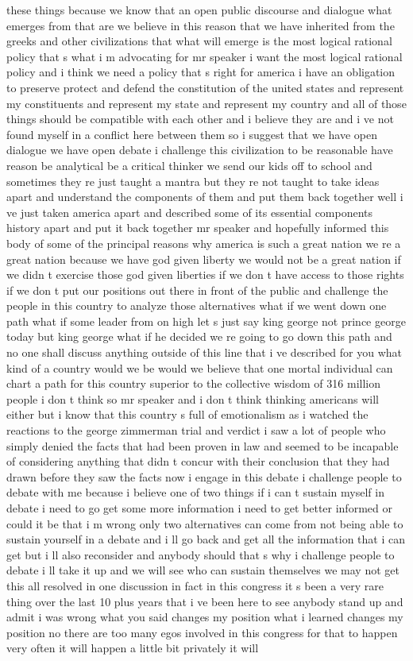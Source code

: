 \documentclass{article}
\begin{document}
these things because we know that an open public discourse and dialogue what emerges from that are we believe in this reason that we have inherited from the greeks and other civilizations that what will emerge is the most logical rational policy that s what i m advocating for mr speaker i want the most logical rational policy and i think we need a policy that s right for america i have an obligation to preserve protect and defend the constitution of the united states and represent my constituents and represent my state and represent my country and all of those things should be compatible with each other and i believe they are and i ve not found myself in a conflict here between them so i suggest that we have open dialogue we have open debate i challenge this civilization to be reasonable have reason be analytical be a critical thinker we send our kids off to school and sometimes they re just taught a mantra but they re not taught to take ideas apart and understand the components of them and put them back together well i ve just taken america apart and described some of its essential components history apart and put it back together mr speaker and hopefully informed this body of some of the principal reasons why america is such a great nation we re a great nation because we have god given liberty we would not be a great nation if we didn t exercise those god given liberties if we don t have access to those rights if we don t put our positions out there in front of the public and challenge the people in this country to analyze those alternatives what if we went down one path what if some leader from on high let s just say king george not prince george today but king george what if he decided we re going to go down this path and no one shall discuss anything outside of this line that i ve described for you what kind of a country would we be would we believe that one mortal individual can chart a path for this country superior to the collective wisdom of 316 million people i don t think so mr speaker and i don t think thinking americans will either but i know that this country s full of emotionalism as i watched the reactions to the george zimmerman trial and verdict i saw a lot of people who simply denied the facts that had been proven in law and seemed to be incapable of considering anything that didn t concur with their conclusion that they had drawn before they saw the facts now i engage in this debate i challenge people to debate with me because i believe one of two things if i can t sustain myself in debate i need to go get some more information i need to get better informed or could it be that i m wrong only two alternatives can come from not being able to sustain yourself in a debate and i ll go back and get all the information that i can get but i ll also reconsider and anybody should that s why i challenge people to debate i ll take it up and we will see who can sustain themselves we may not get this all resolved in one discussion in fact in this congress it s been a very rare thing over the last 10 plus years that i ve been here to see anybody stand up and admit i was wrong what you said changes my position what i learned changes my position no there are too many egos involved in this congress for that to happen very often it will happen a little bit privately it will 
\end{document}
